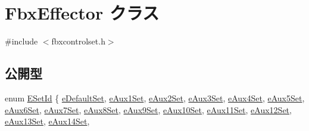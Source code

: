 \hypertarget{class_fbx_effector}{}\section{Fbx\+Effector クラス}
\label{class_fbx_effector}


{\ttfamily \#include $<$fbxcontrolset.\+h$>$}

\subsection*{公開型}
\begin{DoxyCompactItemize}
\item 
enum \hyperlink{class_fbx_effector_a49240bdb189340c6969df38067ee4811}{E\+Set\+Id} \{ \newline
\hyperlink{class_fbx_effector_a49240bdb189340c6969df38067ee4811a00d87d17088597ac3285607cc0a39ac1}{e\+Default\+Set}, 
\hyperlink{class_fbx_effector_a49240bdb189340c6969df38067ee4811aa1655dcb8be739654364c1e936419873}{e\+Aux1\+Set}, 
\hyperlink{class_fbx_effector_a49240bdb189340c6969df38067ee4811ae28cd00d92ee1369774b81642af67489}{e\+Aux2\+Set}, 
\hyperlink{class_fbx_effector_a49240bdb189340c6969df38067ee4811a08f5422aa21b7e5f34be655ebe44e258}{e\+Aux3\+Set}, 
\newline
\hyperlink{class_fbx_effector_a49240bdb189340c6969df38067ee4811a3340a31863e842713084ae1151c25009}{e\+Aux4\+Set}, 
\hyperlink{class_fbx_effector_a49240bdb189340c6969df38067ee4811a62c78f1c64f55e29de5949b1c366387f}{e\+Aux5\+Set}, 
\hyperlink{class_fbx_effector_a49240bdb189340c6969df38067ee4811af31bf9fd422a29b05d5afa029be99f77}{e\+Aux6\+Set}, 
\hyperlink{class_fbx_effector_a49240bdb189340c6969df38067ee4811ae3bcb08c54f5e4c81a9102debe75cc51}{e\+Aux7\+Set}, 
\newline
\hyperlink{class_fbx_effector_a49240bdb189340c6969df38067ee4811ac48b23c15bc8a74edbc74593aaa749c0}{e\+Aux8\+Set}, 
\hyperlink{class_fbx_effector_a49240bdb189340c6969df38067ee4811a58f0506d8cdfb1706a1522cd6c387dd3}{e\+Aux9\+Set}, 
\hyperlink{class_fbx_effector_a49240bdb189340c6969df38067ee4811a78f8ce9189c575256d5a511a344e50da}{e\+Aux10\+Set}, 
\hyperlink{class_fbx_effector_a49240bdb189340c6969df38067ee4811ab3dfbf8c7524d81d3cddb6c0cb9bb4ac}{e\+Aux11\+Set}, 
\newline
\hyperlink{class_fbx_effector_a49240bdb189340c6969df38067ee4811ad2e3cee52756295e2e9f3029d75325ef}{e\+Aux12\+Set}, 
\hyperlink{class_fbx_effector_a49240bdb189340c6969df38067ee4811ab9788d1faa84ed59e3038a0c0f56c277}{e\+Aux13\+Set}, 
\hyperlink{class_fbx_effector_a49240bdb189340c6969df38067ee4811a2316def323e28eb175c45d087ac9c92e}{e\+Aux14\+Set}, 

\end{DoxyCompactItemize}
